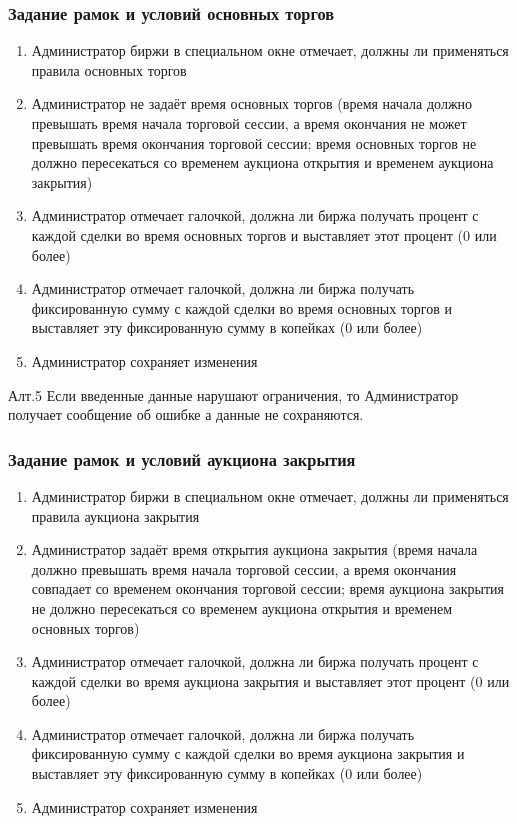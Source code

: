 \documentclass[a4paper, 12pt]{article}        %
\begin{document}
\subsubsection{Задание рамок и условий основных торгов}

\begin{enumerate}
\item Администратор биржи в специальном окне отмечает, должны ли применяться правила основных торгов
\item Администратор не задаёт время основных торгов (время начала должно превышать время начала торговой сессии, а время окончания не может превышать время окончания торговой сессии; время основных торгов не должно пересекаться со временем аукциона открытия и временем аукциона закрытия)
\item Администратор отмечает галочкой, должна ли биржа получать процент с каждой сделки во время основных торгов и выставляет этот процент (0 или более)
\item Администратор отмечает галочкой, должна ли биржа получать фиксированную сумму с каждой сделки во время основных торгов и выставляет эту фиксированную сумму в копейках (0 или более)
\item Администратор сохраняет изменения
\end{enumerate}

Алт.5 Если введенные данные нарушают ограничения, то Администратор получает сообщение об ошибке а данные не сохраняются.

\subsubsection{Задание рамок и условий аукциона закрытия}

\begin{enumerate}
\item Администратор биржи в специальном окне отмечает, должны ли применяться правила аукциона закрытия
\item Администратор задаёт время открытия аукциона закрытия (время начала должно превышать время начала торговой сессии, а время окончания совпадает со временем окончания торговой сессии; время аукциона закрытия не должно пересекаться со временем аукциона открытия и временем основных торгов)
\item Администратор отмечает галочкой, должна ли биржа получать процент с каждой сделки во время аукциона закрытия и выставляет этот процент (0 или более)
\item Администратор отмечает галочкой, должна ли биржа получать фиксированную сумму с каждой сделки во время аукциона закрытия и выставляет эту фиксированную сумму в копейках (0 или более)
\item Администратор сохраняет изменения
\end{enumerate}
\end{document}
